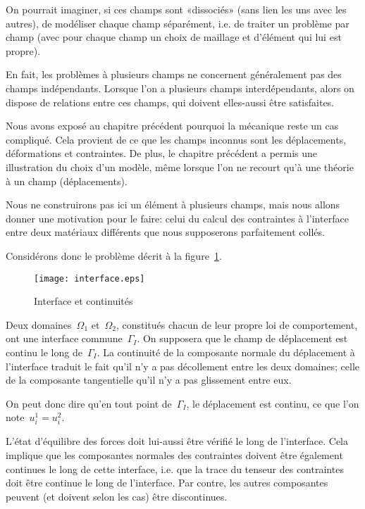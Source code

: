 On pourrait imaginer, si ces champs sont «dissociés» (sans lien les uns avec les autres), de modéliser chaque champ séparément, i.e. de traiter un problème par champ (avec pour chaque champ un choix de maillage et d'élément qui lui est propre).

En fait, les problèmes à plusieurs champs ne concernent généralement pas des champs indépendants. Lorsque l'on a plusieurs champs interdépendants, alors on dispose de relations entre ces champs, qui doivent elles-aussi être satisfaites.

\medskip
Nous avons exposé au chapitre précédent pourquoi la mécanique reste un cas compliqué. Cela provient de ce que les champs inconnus sont les déplacements, déformations et contraintes. De plus, le chapitre précédent a permis une illustration du choix d'un modèle, même lorsque l'on ne recourt qu'à une théorie à un champ (déplacements).

\medskip
Nous ne construirons pas ici un élément à plusieurs champs, mais nous allons donner une motivation pour le faire: celui du calcul des contraintes à l'interface entre deux matériaux différents que nous supposerons parfaitement collés.

Considérons donc le problème décrit à la figure~\ref{interf}.
\begin{figure}[h!]
\centering
\texttt{[image: interface.eps]}
\caption{Interface et continuités}\label{interf}
\end{figure}
Deux domaines~$\Omega_1$ et~$\Omega_2$, constitués chacun de leur propre loi de comportement, ont une interface commune~$\Gamma_I$. On supposera que le champ de déplacement est continu le long de~$\Gamma_I$. La continuité de la composante normale du déplacement à l'interface traduit le fait qu'il n'y a pas décollement entre les deux domaines; celle de la composante tangentielle qu'il n'y a pas glissement entre eux.

On peut donc dire qu'en tout point de~$\Gamma_I$, le déplacement est continu, ce que l'on note~$u_i^1=u_i^2$.

\medskip
L'état d'équilibre des forces doit lui-aussi être vérifié le long de l'interface. Cela implique que les composantes normales des contraintes doivent être également continues le long de cette interface, i.e. que la trace du tenseur des contraintes doit être continue le long de l'interface. Par contre, les autres composantes peuvent (et doivent selon les cas) être discontinues.

